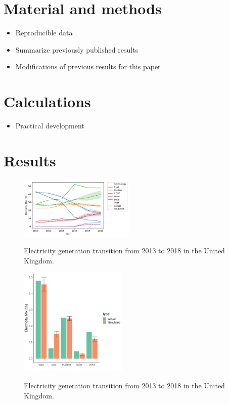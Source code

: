 \documentclass[final,3p,times,twocolumn,numbers]{elsarticle}
\begin{document}
\section{Material and methods}
\label{sec:methods}
\begin{itemize}
	\item Reproducible data
	\item Summarize previously published results
	\item Modifications of previous results for this paper
\end{itemize}

\section{Calculations}
\label{sec:calculations}

\begin{itemize}
	\item Practical development
\end{itemize}

\section{Results}
\label{sec:results}



\begin{figure}
\centering
\includegraphics[width=0.49\textwidth]{figures/results/throughout_years.pdf}
\label{uk_historical_mix}
\caption{Electricity generation transition from 2013 to 2018 in the United Kingdom.}
\end{figure}


\begin{figure}
\centering
\includegraphics[width=0.46\textwidth]{figures/results/best_run.pdf}
\label{uk_historical_mix}
\caption{Electricity generation transition from 2013 to 2018 in the United Kingdom.}
\end{figure}
\end{document}
